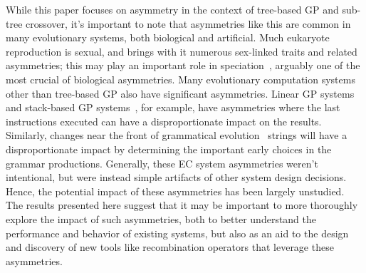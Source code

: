 \documentclass{sig-alternate}
\begin{document}
While this paper focuses on asymmetry in the context of tree-based GP and sub-tree crossover, it's important to note
that asymmetries like this are common in many evolutionary systems, both biological and artificial. Much eukaryote
reproduction is sexual, and brings with it numerous sex-linked traits and related asymmetries; this may play an
important role in speciation~\cite{qvarnstrom2009speciation}, arguably one of the most crucial of biological
asymmetries. Many evolutionary computation systems other than tree-based GP also have significant asymmetries. Linear
GP systems~\cite{brameier2007linear} and stack-based GP systems~\cite{spector:2002:GPEM}, for example, have asymmetries
where the last instructions executed can have a disproportionate impact on the results. Similarly, changes near the
front of grammatical evolution~\cite{o2003grammatical} strings will have a disproportionate impact by determining the
important early choices in the grammar productions. Generally, these EC system asymmetries weren't intentional, but
were instead simple artifacts of other system design decisions. Hence, the potential impact of these asymmetries has
been largely unstudied. The results presented here suggest that it may be important to more thoroughly explore the
impact of such asymmetries, both to better understand the performance and behavior of existing systems, but also as an
aid to the design and discovery of new tools like recombination operators that leverage these asymmetries.





\end{document}
